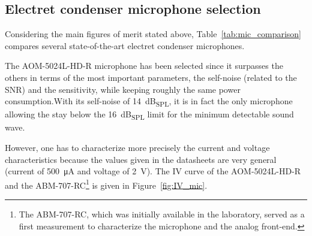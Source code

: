 \documentclass{EPL-master-thesis-covers-EN}
\begin{document}
\subsection*{Electret condenser microphone selection}

Considering the main figures of merit stated above, Table~\ref{tab:mic_comparison} compares several state-of-the-art electret condenser microphones.

\begin{table}[H]
\centering
{}
\caption{Comparison of several electret condenser microphones}
\label{tab:mic_comparison}
\end{table}

The AOM-5024L-HD-R microphone has been selected since it surpasses the others in terms of the most important parameters, the self-noise (related to the SNR) and the sensitivity, while keeping roughly the same power consumption.With its self-noise of \SI{14}{dB_{SPL}}, it is in fact the only microphone allowing the stay below the \SI{16}{dB_{SPL}} limit for the minimum detectable sound wave.

However, one has to characterize more precisely the current and voltage characteristics because the values given in the datasheets are very general (current of \SI{500}{\micro A} and voltage of \SI{2}{V}). The IV curve of the AOM-5024L-HD-R and the ABM-707-RC\footnote{The ABM-707-RC, which was initially available in the laboratory, served as a first measurement to characterize the microphone and the analog front-end.} is given in Figure~\ref{fig:IV_mic}.
\end{document}
